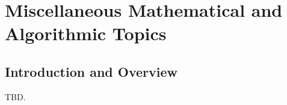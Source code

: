 \chapter{Miscellaneous Mathematical and Algorithmic Topics}
\label{cmat0}

\section{Introduction and Overview}
\label{cmat0:siov0}

TBD.

